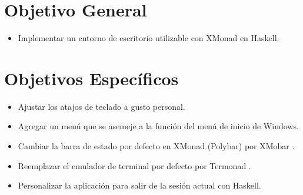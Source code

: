 \section[General]{Objetivo General}
\begin{itemize}
  \item Implementar un entorno de escritorio
  utilizable con XMonad \cite{haskell_xmonad}
  en Haskell.
\end{itemize}
\section[Específicos]{Objetivos Específicos}
\begin{itemize}
  \item Ajustar los atajos de teclado a gusto
  personal.
  \item Agregar un menú que se asemeje a la función
  del menú de inicio de Windows.
  \item Cambiar la barra de estado por defecto en
  XMonad (Polybar) por XMobar \cite{hackage_xmobar}.
  \item Reemplazar el emulador de terminal por
  defecto por Termonad \cite{hackage_termonad}.
  \item Personalizar la aplicación para salir
  de la sesión actual con Haskell.
\end{itemize}
